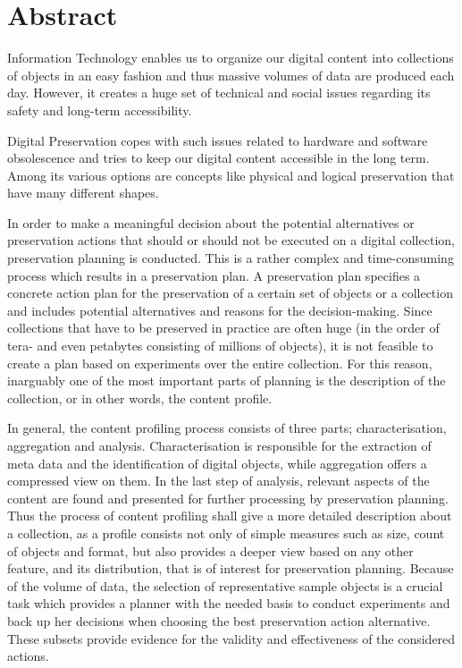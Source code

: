 \chapter*{Abstract}
\vspace{-1cm}
Information Technology enables us to organize our digital content into collections of objects in an easy fashion and thus massive volumes of data are produced each day.
However, it creates a huge set of technical and social issues regarding its safety and long-term accessibility.

Digital Preservation copes with such issues related to hardware and software obsolescence and tries to keep our digital content accessible in the long term.
Among its various options are concepts like physical and logical preservation that have many different shapes.

In order to make a meaningful decision about the potential alternatives or preservation actions that should or should not be executed on a digital collection, preservation planning is conducted.
This is a rather complex and time-consuming process which results in a preservation plan.
A preservation plan specifies a concrete action plan for the preservation of a certain set of objects or a collection and includes potential alternatives and reasons for the decision-making.
Since collections that have to be preserved in practice are often huge (in the order of tera- and even petabytes consisting of millions of objects), it is not feasible to create a plan based on experiments over the entire collection. 
For this reason, inarguably one of the most important parts of planning is the description of the collection, or in other words, the content profile.

In general, the content profiling process consists of three parts; characterisation, aggregation and analysis.
Characterisation is responsible for the extraction of meta data and the identification of digital objects, while aggregation offers a compressed view on them.
In the last step of analysis, relevant aspects of the content are found and presented for further processing by preservation planning.
Thus the process of content profiling shall give a more detailed description about a collection, as a profile consists not only of simple measures such as size, count of objects and format, but also provides a deeper view based on any other feature, and its distribution, that is of interest for preservation planning.
Because of the volume of data, the selection of representative sample objects is a crucial task which provides a planner with the needed basis to conduct experiments and back up her decisions when choosing the best preservation action alternative.
These subsets provide evidence for the validity and effectiveness of the considered actions.

